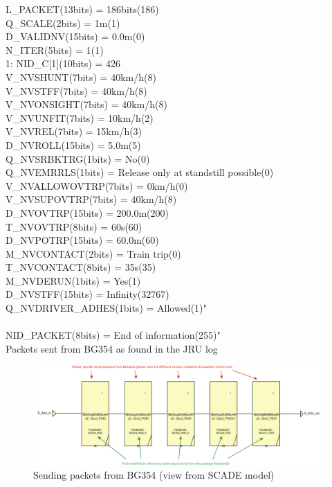 \documentclass{template/openetcs_article}
\begin{document}
\begin{table}[H]
L\_PACKET(13bits) = 186bits(186) \\
Q\_SCALE(2bits) = 1m(1) \\
D\_VALIDNV(15bits) = 0.0m(0) \\
N\_ITER(5bits) = 1(1) \\
    1: NID\_C[1](10bits) = 426 \\
V\_NVSHUNT(7bits) = 40km/h(8) \\
V\_NVSTFF(7bits) = 40km/h(8) \\
V\_NVONSIGHT(7bits) = 40km/h(8) \\
V\_NVUNFIT(7bits) = 10km/h(2) \\
V\_NVREL(7bits) = 15km/h(3) \\
D\_NVROLL(15bits) = 5.0m(5) \\
Q\_NVSRBKTRG(1bits) = No(0) \\
Q\_NVEMRRLS(1bits) = Release only at standstill possible(0) \\
V\_NVALLOWOVTRP(7bits) = 0km/h(0) \\
V\_NVSUPOVTRP(7bits) = 40km/h(8) \\
D\_NVOVTRP(15bits) = 200.0m(200) \\
T\_NVOVTRP(8bits) = 60s(60) \\
D\_NVPOTRP(15bits) = 60.0m(60) \\
M\_NVCONTACT(2bits) = Train trip(0) \\
T\_NVCONTACT(8bits) = 35s(35) \\
M\_NVDERUN(1bits) = Yes(1) \\
D\_NVSTFF(15bits) = Infinity(32767) \\
Q\_NVDRIVER\_ADHES(1bits) = Allowed(1)" \\
\\
NID\_PACKET(8bits) = End of information(255)" \\
\caption{Packets sent from BG354 as found in the JRU log}
  \label{tab:pbg354}
\end{table}

\begin{figure}[H]
  \centering
  \includegraphics[width=6.5in]{images/PacketsBG354}
  \caption{Sending packets from BG354 (view from SCADE model)}
  \label{fig:packets354SCADE}
\end{figure}
\end{document}
